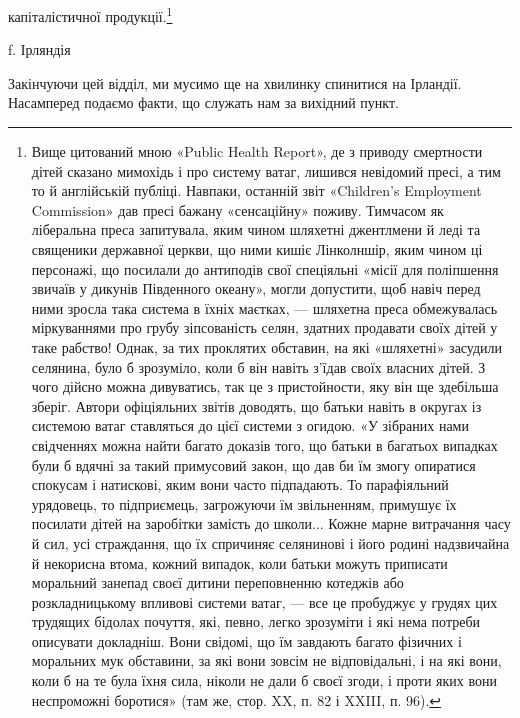 капіталістичної продукції.\footnote{
Вище цитований мною «Public Health Report», де з приводу
смертности дітей сказано мимохідь і про систему ватаг, лишився невідомий
пресі, а тим то й англійській публіці. Навпаки, останній звіт «Children’s
Employment Commission» дав пресі бажану «сенсаційну» поживу.
Тимчасом як ліберальна преса запитувала, яким чином шляхетні джентлмени
й леді та священики державної церкви, що ними кишіє Лінколншір,
яким чином ці персонажі, що посилали до антиподів свої спеціяльні
«місії для поліпшення звичаїв у дикунів Південного океану», могли допустити,
щоб навіч перед ними зросла така система в їхніх маєтках, —
шляхетна преса обмежувалась міркуваннями про грубу зіпсованість
селян, здатних продавати своїх дітей у таке рабство! Однак, за тих проклятих
обставин, на які «шляхетні» засудили селянина, було б зрозуміло,
коли б він навіть з’їдав своїх власних дітей. З чого дійсно можна
дивуватись, так це з пристойности, яку він ще здебільша зберіг. Автори
офіціяльних звітів доводять, що батьки навіть в округах із системою ватаг
ставляться до цієї системи з огидою. «У зібраних нами свідченнях можна
найти багато доказів того, що батьки в багатьох випадках були б вдячні
за такий примусовий закон, що дав би їм змогу опиратися спокусам і
натискові, яким вони часто підпадають. То парафіяльний урядовець,
то підприємець, загрожуючи їм звільненням, примушує їх посилати дітей
на заробітки замість до школи... Кожне марне витрачання часу й сил,
усі страждання, що їх спричиняє селянинові і його родині надзвичайна
й некорисна втома, кожний випадок, коли батьки можуть приписати
моральний занепад своєї дитини переповненню котеджів або розкладницькому
впливові системи ватаг, — все це пробуджує у грудях цих трудящих
бідолах почуття, які, певно, легко зрозуміти і які нема потреби описувати
докладніш. Вони свідомі, що їм завдають багато фізичних і моральних
мук обставини, за які вони зовсім не відповідальні, і на які вони,
коли б на те була їхня сила, ніколи не дали б своєї згоди, і проти яких
вони неспроможні боротися» (там же, стор. XX, п. 82 і XXIII, п. 96).
}

f. Ірляндія

Закінчуючи цей відділ, ми мусимо ще на хвилинку спинитися
на Ірландії. Насамперед подаємо факти, що служать нам
за вихідний пункт.
